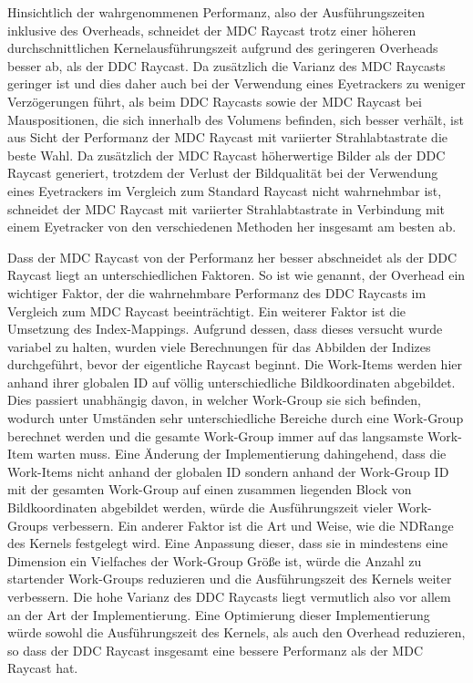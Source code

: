 Hinsichtlich der wahrgenommenen Performanz, also der Ausführungszeiten inklusive des Overheads, schneidet der MDC Raycast trotz einer höheren durchschnittlichen Kernelausführungszeit aufgrund des geringeren Overheads besser ab, als der DDC Raycast.
Da zusätzlich die Varianz des MDC Raycasts geringer ist und dies daher auch bei der Verwendung eines Eyetrackers zu weniger Verzögerungen führt, als beim DDC Raycasts sowie der MDC Raycast bei Mauspositionen, die sich innerhalb des Volumens befinden, sich besser verhält, ist aus Sicht der Performanz der MDC Raycast mit variierter Strahlabtastrate die beste Wahl.
Da zusätzlich der MDC Raycast höherwertige Bilder als der DDC Raycast generiert, trotzdem der Verlust der Bildqualität bei der Verwendung eines Eyetrackers im Vergleich zum Standard Raycast nicht wahrnehmbar ist, schneidet der MDC Raycast mit variierter Strahlabtastrate in Verbindung mit einem Eyetracker von den verschiedenen Methoden her insgesamt am besten ab.

Dass der MDC Raycast von der Performanz her besser abschneidet als der DDC Raycast liegt an unterschiedlichen Faktoren.
So ist wie genannt, der Overhead ein wichtiger Faktor, der die wahrnehmbare Performanz des DDC Raycasts im Vergleich zum MDC Raycast beeinträchtigt.
Ein weiterer Faktor ist die Umsetzung des Index-Mappings.
Aufgrund dessen, dass dieses versucht wurde variabel zu halten, wurden viele Berechnungen für das Abbilden der Indizes durchgeführt, bevor der eigentliche Raycast beginnt.
Die Work-Items werden hier anhand ihrer globalen ID auf völlig unterschiedliche Bildkoordinaten abgebildet.
Dies passiert unabhängig davon, in welcher Work-Group sie sich befinden, wodurch unter Umständen sehr unterschiedliche Bereiche durch eine Work-Group berechnet werden und die gesamte Work-Group immer auf das langsamste Work-Item warten muss.
Eine Änderung der Implementierung dahingehend, dass die Work-Items nicht anhand der globalen ID sondern anhand der Work-Group ID mit der gesamten Work-Group auf einen zusammen liegenden Block von Bildkoordinaten abgebildet werden, würde die Ausführungszeit vieler Work-Groups verbessern.
Ein anderer Faktor ist die Art und Weise, wie die NDRange des Kernels festgelegt wird.
Eine Anpassung dieser, dass sie in mindestens eine Dimension ein Vielfaches der Work-Group Größe ist, würde die Anzahl zu startender Work-Groups reduzieren und die Ausführungszeit des Kernels weiter verbessern.
Die hohe Varianz des DDC Raycasts liegt vermutlich also vor allem an der Art der Implementierung.
Eine Optimierung dieser Implementierung würde sowohl die Ausführungszeit des Kernels, als auch den Overhead reduzieren, so dass der DDC Raycast insgesamt eine bessere Performanz als der MDC Raycast hat.